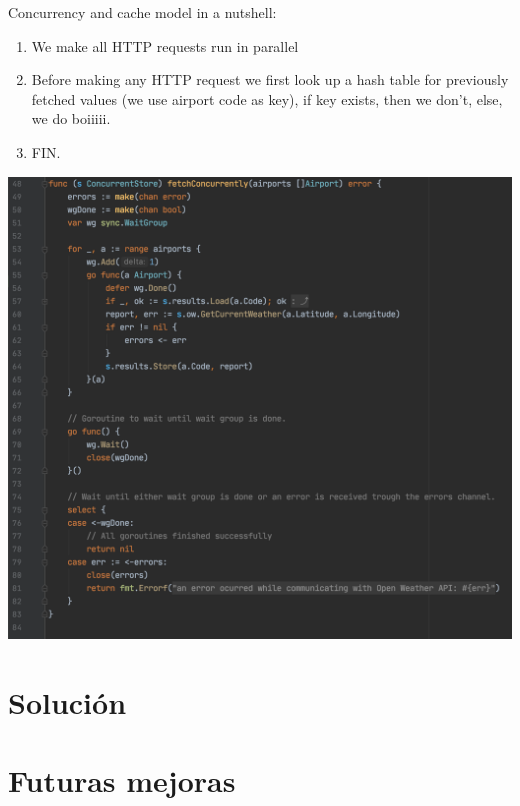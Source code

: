 \documentclass[10pt, letterpaper]{article}
\begin{document}
Concurrency and cache model in a nutshell:
\begin{enumerate}
  \item We make all HTTP requests run in parallel
  \item Before making any HTTP request we first look up a hash table for previously fetched values (we use airport code as key), if key exists, then we don't, else, we do boiiiii.
  \item FIN.
\end{enumerate}

\begin{center}
  \includegraphics[scale=.4]{concurrency.png}
\end{center}

\section{Solución}
\section{Futuras mejoras}
\end{document}
